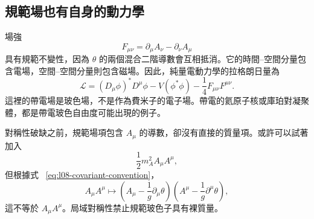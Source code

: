 \begin{classroomqa}
\end{classroomqa}

\begin{classroomqa}
\end{classroomqa}

\begin{classroomqa}
\end{classroomqa}

\subsection{規範場也有自身的動力學}

場強
\begin{equation}
  F_{\mu\nu}=\partial_\mu A_\nu-\partial_\nu A_\mu
  \label{eq:l08-field-strength}
\end{equation}
具有規範不變性，因為 \(\theta\) 的兩個混合二階導數會互相抵消。它的時間--空間分量包含電場，空間--空間分量則包含磁場。因此，純量電動力學的拉格朗日量為
\begin{equation}
  \mathcal L
  =(D_\mu\phi)^*D^\mu\phi
  -V(\phi^*\phi)
  -\frac14F_{\mu\nu}F^{\mu\nu}.
  \label{eq:l08-abelian-higgs}
\end{equation}
這裡的帶電場是玻色場，不是作為費米子的電子場。帶電的氦原子核或庫珀對凝聚體，都是帶電玻色自由度可能出現的例子。

對稱性破缺之前，規範場項包含 \(A_\mu\) 的導數，卻沒有直接的質量項。或許可以試著加入
\begin{equation}
  \frac12m_A^2A_\mu A^\mu,
\end{equation}
但根據式 ~\eqref{eq:l08-covariant-convention}，
\begin{equation}
  A_\mu A^\mu
  \longmapsto
  \left(A_\mu-\frac1g\partial_\mu\theta\right)
  \left(A^\mu-\frac1g\partial^\mu\theta\right),
  \label{eq:l08-bare-mass-fails}
\end{equation}
這不等於 \(A_\mu A^\mu\)。局域對稱性禁止規範玻色子具有裸質量。

